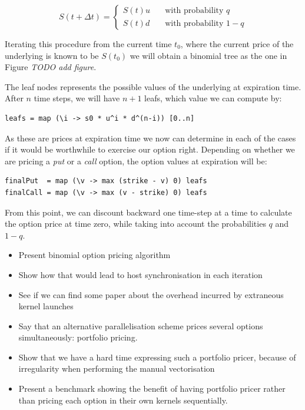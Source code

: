 \documentclass{llncs2e/llncs}
\begin{document}
\begin{equation}
S(t+\Delta t) = \left\{
  \begin{array}{ll}
    S(t)u & \quad \textrm{with probability $q$} \\
    S(t)d & \quad \textrm{with probability $1-q$}
  \end{array} \right.
\end{equation}

Iterating this procedure from the current time $t_0$, where the
current price of the underlying is known to be $S(t_0)$ we will obtain
a binomial tree as the one in Figure \emph{TODO add figure}.

The leaf nodes represents the possible values of the underlying at
expiration time. After $n$ time steps, we will have $n+1$ leafs, which
value we can compute by:
\begin{verbatim}
leafs = map (\i -> s0 * u^i * d^(n-i)) [0..n]
\end{verbatim}
As these are prices at expiration time we now can determine in each of
the cases if it would be worthwhile to exercise our option
right. Depending on whether we are pricing a \emph{put} or a
\emph{call} option, the option values at expiration will be:
\begin{verbatim}
finalPut  = map (\v -> max (strike - v) 0) leafs
finalCall = map (\v -> max (v - strike) 0) leafs
\end{verbatim}
From this point, we can discount backward one time-step at a time to
calculate the option price at time zero, while taking into account the
probabilities $q$ and $1-q$.

\begin{itemize}
\item Present binomial option pricing algorithm
\item Show how that would lead to host synchronisation in each iteration
\item See if we can find some paper about the overhead incurred by
  extraneous kernel launches
\item Say that an alternative parallelisation scheme prices several
  options simultaneously: portfolio pricing.
\item Show that we have a hard time expressing such a portfolio
  pricer, because of irregularity when performing the manual
  vectorisation
\item Present a benchmark showing the benefit of having portfolio
  pricer rather than pricing each option in their own kernels
  sequentially.
\end{itemize}
\end{document}
